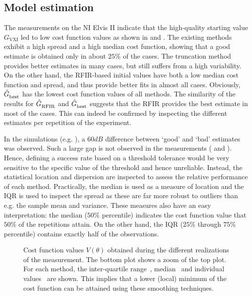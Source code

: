 \subsection{Model estimation}
  The measurements on the NI Elvis II indicate that the high-quality starting value $G_{\mathrm{VXI}}$ led to low cost function values as shown in  and .
  The existing methods exhibit a high spread and a high median cost function, showing that a good estimate is obtained only in about $25\%$ of the cases.
  The truncation method provides better estimates in many cases, but still suffers from a high variability.
  On the other hand, the \gls{RFIR}-based initial values have both a low median cost function and spread, and thus provide better fits in almost all cases.
  Obviously, $\hat{G}_{\mathrm{best}}^{\mathrm{}}$ has the lowest cost function values of all methods.
  The similarity of the results for $\hat{G}_{\mathrm{RFIR}}^{\mathrm{}}$ and $\hat{G}_{\mathrm{best}}^{\mathrm{}}$ suggests that the \gls{RFIR} provides the best estimate in most of the cases.
  This can indeed be confirmed by inspecting the different estimates per repetition of the experiment.

\begin{remark}
  In the simulations (e.g. ), a $60\unit{dB}$ difference between `good' and `bad' estimates was observed.
  Such a large gap is not observed in the measurements ( and ).
  Hence, defining a success rate based on a threshold tolerance would be very sensitive to the specific value of the threshold and hence unreliable.
  Instead, the statistical location and dispersion are inspected to assess the relative performance of each method.
  Practically, the median is used as a measure of location and the \gls{IQR} is used to inspect the spread as these are far more robust to outliers than e.g. the sample mean and variance.
  These measures also have an easy interpretation: the median ($50\%$ percentile) indicates the cost function value that $50\%$ of the repetitions attain.
  On the other hand, the \gls{IQR} ($25\%$ through $75\%$ percentile) contains  exactly half of the observations.
\end{remark}

\begin{figure}[p]
  \centering
  \setlength{\figurewidth}{0.85\columnwidth}
  \setlength{\figureheight}{0.68\figurewidth}
  \setlength{\figurewidth}{0.75\columnwidth}
  
  \caption[Cost function values over the different measurements.]{Cost function values $V(\theta)$ obtained during the different realizations of the measurement.
  The bottom plot shows a zoom of the top plot.
  For each method, the inter-quartile range~, median~ and individual values~ are shown.
  This implies that a lower (local) minimum of the cost function can be attained using these smoothing techniques.}
  \label{fig:costMeasurements}
\end{figure}

